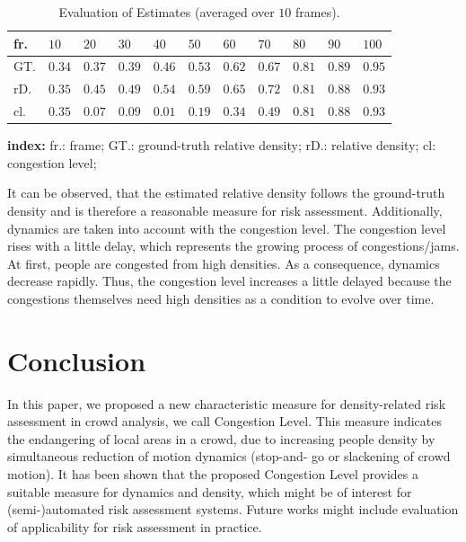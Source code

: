 \documentclass[a4paper, 10pt, journal]{wissarbIEEE}      %
\begin{document}
\begin{table}[h]
\centering
\caption{Evaluation of Estimates (averaged over $10$ frames).}
   \begin{tabularx}{0.5\textwidth}{p{}p{}p{}p{}p{}p{}p{}p{}p{}p{}p{}}
   		 \toprule 
   		 fr. & $10$ & $20$ & $30$ & $40$ & $50$ & $60$ & $70$ & $80$ & $90$ & $100$ \\
   		 \midrule
		 GT. & $0.34$ & $0.37$ & $0.39$ & $0.46$ & $0.53$ & $0.62$ & $0.67$ & $0.81$ & $0.89$ & $0.95$ \\
		 \midrule
		 rD. & $0.35$ & $0.45$ & $0.49$ & $0.54$ & $0.59$ & $0.65$ & $0.72$ & $0.81$ & $0.88$ & $0.93$ \\
		 \midrule
		 cl. & $0.35$ & $0.07$ & $0.09$ & $0.01$ & $0.19$ & $0.34$ & $0.49$ & $0.81$ & $0.88$ & $0.93$ \\ 
		 \midrule
   \end{tabularx}  \label{tab:eval}
   \vskip 1pt
   \begin{tiny}
	\textbf{index:} \hskip 5pt fr.: frame; \hskip 5pt GT.: ground-truth relative density; \hskip 5pt rD.: relative density; \hskip 5pt cl: congestion level;
	\end{tiny}
\end{table}
It can be observed, that the estimated relative density follows the ground-truth density and is therefore a reasonable measure for risk assessment. Additionally, dynamics are taken into account with the congestion level. The congestion level rises with a little delay, which represents the growing process of congestions/jams. At first, people are congested from high densities. As a consequence, dynamics decrease rapidly. Thus, the congestion level increases a little delayed because the congestions themselves need high densities as a condition to evolve over time.

\section{Conclusion}
\label{sec:conclusion}
In this paper, we proposed a new characteristic measure for density-related risk assessment in crowd analysis, we call 
Congestion Level. This measure indicates the endangering of local areas in a crowd, due to increasing people density by simultaneous reduction of motion dynamics (stop-and- go or slackening of crowd motion). It has been shown that the proposed Congestion Level provides a suitable measure for dynamics and density, which might be of interest for
(semi-)automated risk assessment systems. Future works might include evaluation of applicability for risk assessment in practice.


\end{document}
